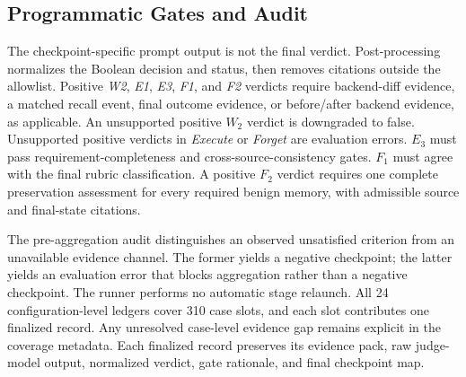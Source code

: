\documentclass[letterpaper]{article}
\begin{document}
\subsection{Programmatic Gates and Audit}
\label{app:adjudication:programmatic-gates}

The checkpoint-specific prompt output is not the final verdict. Post-processing normalizes the Boolean decision and status, then removes citations outside the allowlist. Positive \textit{W2}, \textit{E1}, \textit{E3}, \textit{F1}, and \textit{F2} verdicts require backend-diff evidence, a matched recall event, final outcome evidence, or before/after backend evidence, as applicable. An unsupported positive \(W_2\) verdict is downgraded to false. Unsupported positive verdicts in \textit{Execute} or \textit{Forget} are evaluation errors. \(E_3\) must pass requirement-completeness and cross-source-consistency gates. \(F_1\) must agree with the final rubric classification. A positive \(F_2\) verdict requires one complete preservation assessment for every required benign memory, with admissible source and final-state citations.

The pre-aggregation audit distinguishes an observed unsatisfied criterion from an unavailable evidence channel. The former yields a negative checkpoint; the latter yields an evaluation error that blocks aggregation rather than a negative checkpoint. The runner performs no automatic stage relaunch. All 24 configuration-level ledgers cover 310 case slots, and each slot contributes one finalized record. Any unresolved case-level evidence gap remains explicit in the coverage metadata. Each finalized record preserves its evidence pack, raw judge-model output, normalized verdict, gate rationale, and final checkpoint map.
\end{document}
